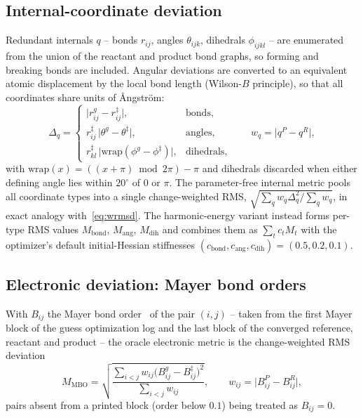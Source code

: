 \documentclass[11pt]{article}
\begin{document}
\subsection{Internal-coordinate deviation}
Redundant internals $q$ -- bonds $r_{ij}$, angles $\theta_{ijk}$, dihedrals
$\phi_{ijkl}$ -- are enumerated from the union of the reactant and product bond
graphs, so forming and breaking bonds are included. Angular deviations are
converted to an equivalent atomic displacement by the local bond length
(Wilson-$B$ principle), so that all coordinates share units of \AA ngstr\"om:
\begin{equation}
\Delta_{q} =
\begin{cases}
\lvert r^{g}_{ij}-r^{\ddagger}_{ij}\rvert, & \text{bonds},\\[2pt]
r^{\ddagger}_{ij}\,\lvert \theta^{g}-\theta^{\ddagger}\rvert, & \text{angles},\\[2pt]
r^{\ddagger}_{kl}\,\lvert \mathrm{wrap}(\phi^{g}-\phi^{\ddagger})\rvert, & \text{dihedrals},
\end{cases}
\qquad
w_{q} = \bigl\lvert q^{P}-q^{R}\bigr\rvert ,
\end{equation}
with $\mathrm{wrap}(x)=((x+\pi)\bmod 2\pi)-\pi$ and dihedrals discarded when
either defining angle lies within $20^{\circ}$ of $0$ or $\pi$. The
parameter-free internal metric pools all coordinate types into a single
change-weighted RMS, $\sqrt{\sum_q w_q\Delta_q^{2}/\sum_q w_q}$, in exact analogy
with~\eqref{eq:wrmsd}. The harmonic-energy variant instead forms per-type RMS
values $M_{\mathrm{bond}}$, $M_{\mathrm{ang}}$, $M_{\mathrm{dih}}$ and combines
them as $\sum_t c_t M_t$ with the optimizer's default initial-Hessian stiffnesses
$(c_{\mathrm{bond}},c_{\mathrm{ang}},c_{\mathrm{dih}})=(0.5,0.2,0.1)$.

\subsection{Electronic deviation: Mayer bond orders}
With $B_{ij}$ the Mayer bond order~\cite{Mayer1983,Mayer2007} of the pair $(i,j)$
-- taken from the first Mayer block of the guess optimization log and the last
block of the converged reference, reactant and product -- the oracle electronic
metric is the change-weighted RMS deviation
\begin{equation}
M_{\mathrm{MBO}} = \sqrt{\frac{\sum_{i<j} w_{ij}\bigl(B^{g}_{ij}-B^{\ddagger}_{ij}\bigr)^{2}}
{\sum_{i<j} w_{ij}}},
\qquad w_{ij}=\bigl\lvert B^{P}_{ij}-B^{R}_{ij}\bigr\rvert ,
\end{equation}
pairs absent from a printed block (order below $0.1$) being treated as $B_{ij}=0$.
\end{document}
